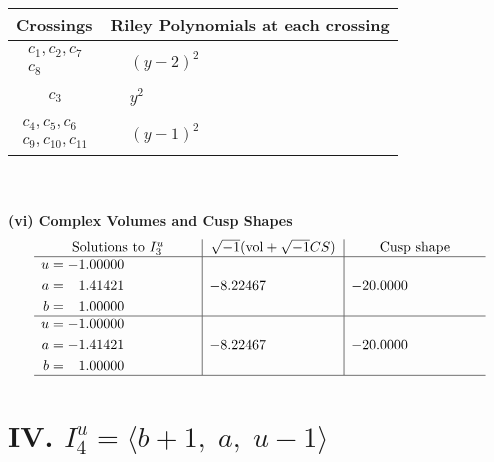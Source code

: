 \documentclass[1p]{elsarticle_modified}
\theoremstyle{definition}
\newcommand{\I}{\sqrt{-1}}
\begin{document}
\begin{tabular}{m{50pt}|m{274pt}}
Crossings & \hspace{64pt}Riley Polynomials at each crossing \\
\hline $$\begin{aligned}c_{1},c_{2},c_{7}\\c_{8}\end{aligned}$$&$\begin{aligned}
&(y-2)^2
\end{aligned}$\\
\hline $$\begin{aligned}c_{3}\end{aligned}$$&$\begin{aligned}
&y^2
\end{aligned}$\\
\hline $$\begin{aligned}c_{4},c_{5},c_{6}\\c_{9},c_{10},c_{11}\end{aligned}$$&$\begin{aligned}
&(y-1)^2
\end{aligned}$\\
\hline
\end{tabular}\\~\\
\newpage\flushleft \textbf{(vi) Complex Volumes and Cusp Shapes}
$$\begin{array}{c|c|c}  
\text{Solutions to }I^u_{3}& \I (\text{vol} + \sqrt{-1}CS) & \text{Cusp shape}\\
 \hline 
\begin{aligned}
u &= -1.00000\phantom{ +0.000000I} \\
a &= \phantom{-}1.41421\phantom{ +0.000000I} \\
b &= \phantom{-}1.00000\phantom{ +0.000000I}\end{aligned}
 & -8.22467\phantom{ +0.000000I} & -20.0000\phantom{ +0.000000I} \\ \hline\begin{aligned}
u &= -1.00000\phantom{ +0.000000I} \\
a &= -1.41421\phantom{ +0.000000I} \\
b &= \phantom{-}1.00000\phantom{ +0.000000I}\end{aligned}
 & -8.22467\phantom{ +0.000000I} & -20.0000\phantom{ +0.000000I}\\
 \hline 
 \end{array}$$\newpage\newpage\renewcommand{\arraystretch}{1}
\centering \section*{IV. $I^u_{4}= \langle b+1,\;a,\;u-1 \rangle$}
\end{document}
